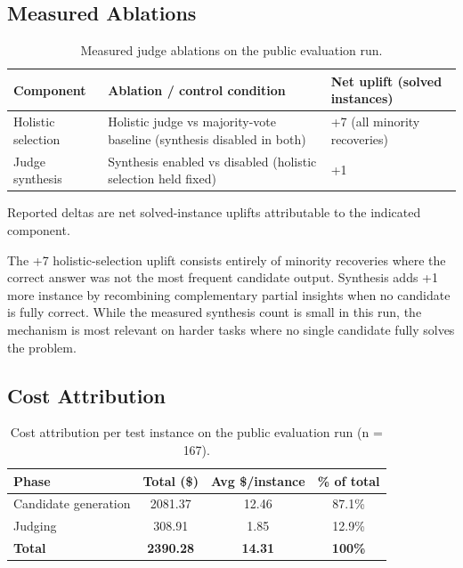 \documentclass[conference]{IEEEtran}
\begin{document}
\subsection{Measured Ablations}\label{measured-ablations}

\begin{table}[htbp]
\caption{Measured judge ablations on the public evaluation run.}
\begin{center}
\scriptsize
\setlength{\tabcolsep}{2pt}
\renewcommand{\arraystretch}{1.1}
\begin{tabular}{|>{\raggedright\arraybackslash}p{}|>{\raggedright\arraybackslash}p{}|>{\raggedright\arraybackslash}p{}|}
\hline
\textbf{Component} & \textbf{Ablation / control condition} & \textbf{Net uplift (solved instances)} \\
\hline
Holistic selection & Holistic judge vs majority-vote baseline (synthesis disabled in both) & +7 (all minority recoveries) \\
Judge synthesis & Synthesis enabled vs disabled (holistic selection held fixed) & +1 \\
\hline
\end{tabular}
\end{center}
\end{table}

Reported deltas are net solved-instance uplifts attributable to the
indicated component.

The +7 holistic-selection uplift consists entirely of minority
recoveries where the correct answer was not the most frequent candidate
output. Synthesis adds +1 more instance by recombining complementary
partial insights when no candidate is fully correct. While the measured
synthesis count is small in this run, the mechanism is most relevant on
harder tasks where no single candidate fully solves the problem.

\subsection{Cost Attribution}\label{cost-attribution}

\begin{table}[htbp]
\caption{Cost attribution per test instance on the public evaluation run (n = 167).}
\begin{center}
\footnotesize
\begin{tabular}{|l|c|c|c|}
\hline
\textbf{Phase} & \textbf{Total (\$)} & \textbf{Avg \$/instance} & \textbf{\% of total} \\
\hline
Candidate generation & 2081.37 & 12.46 & 87.1\% \\
Judging & 308.91 & 1.85 & 12.9\% \\
\hline
\textbf{Total} & \textbf{2390.28} & \textbf{14.31} & \textbf{100\%} \\
\hline
\end{tabular}
\end{center}
\end{table}
\end{document}
